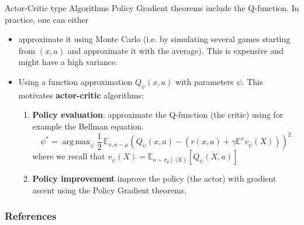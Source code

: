 \documentclass[usenames,handout,aspectratio=169]{beamer}
\DeclareMathOperator*{\argmax}{arg\,max}
\begin{document}
\begin{frame}{Actor-Critic type Algorithms}
Policy Gradient theorems include the Q-function. In practice, one can either 
\begin{itemize}
\item approximate it using Monte Carlo (i.e. by simulating several games starting from $(x,a)$ and approximate it with the average). This is expensive and might have a high variance. 
\item Using a function approximation $Q_\psi (x,a)$ with parameters $\psi$. This motivates \textbf{actor-critic} algorithms:

\begin{enumerate}
\item \textbf{Policy evaluation}: approximate the Q-function (the critic) using for example the Bellman equation.
\[
\psi^* = \argmax_{\psi}\frac1{2}\, \mathbb E_{x,a\sim \mu} \left(Q_\psi(x,a) - (r(x,a) + \gamma \mathbb E^x  v_{\bar \psi}(X)) \right)^2
\] 
where we recall that $v_{\bar \psi}(X) = \mathbb E_{a\sim \pi_\theta(\cdot|X)}[Q_\psi(X,a)] $
\item \textbf{Policy improvement} improve the policy (the actor) with gradient ascent using the Policy Gradient theorems. 
\end{enumerate}

\end{itemize}
\end{frame}




\begin{frame}[allowframebreaks]
\frametitle{References}


 
	
\end{frame}
\end{document}
